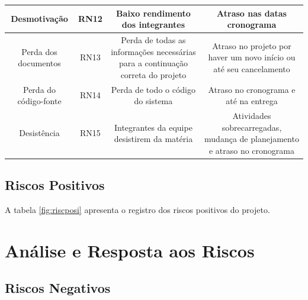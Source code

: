 \begin{table}[!h]
{\begin{tabular}{|c|c|c|c|}
Desmotivação & RN12 & Baixo rendimento dos integrantes & Atraso nas datas cronograma \\ \hline
Perda dos documentos & RN13 & Perda de todas as informações necessárias para a continuação correta do projeto & Atraso no projeto por haver um novo início ou até seu cancelamento \\ \hline
Perda do código-fonte & RN14 & Perda de todo o código do sistema & Atraso no cronograma e até na entrega \\ \hline
Desistência & RN15 & Integrantes da equipe desistirem da matéria & Atividades sobrecarregadas, mudança de planejamento e atraso no cronograma \\ \hline
\end{tabular}%
}
\end{table}


\subsection{Riscos Positivos}

A tabela \ref{fig:riscposi} apresenta o registro dos riscos positivos do projeto.

\begin{table}[!h]
\centering
\caption{Registo dos riscos positivos do projeto}
\label{fig:riscposi}
\end{table}


\section{Análise e Resposta aos Riscos}
\subsection{Riscos Negativos}

